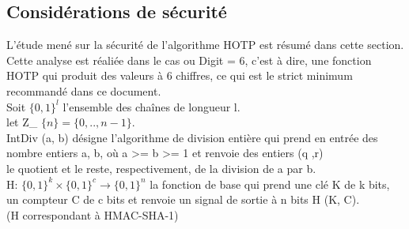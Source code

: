 \documentclass{../res/univ-projet}
\begin{document}
  \subsection{Considérations de sécurité}
L'\'{e}tude men\'{e} sur la s\'{e}curit\'{e} de l'algorithme HOTP est r\'{e}sum\'{e} dans cette section.
  Cette analyse est r\'{e}ali\'{e}e dans le cas ou Digit = 6, c'est \`{a} dire, une fonction HOTP qui produit des valeurs \`{a} 6 chiffres, ce qui est le strict minimum recommand\'{e} dans ce document.\\
  Soit $\{ 0,1 \} ^l$ l'ensemble des cha\^{i}nes de longueur l.\\
  let Z\_ $\{n\} = \{0, ..,n-1\}$.\\
  IntDiv (a, b) d\'{e}signe l'algorithme de division enti\`{e}re qui prend en entr\'{e}e des nombre entiers a, b, o\`{u} a >= b >= 1 et renvoie des entiers (q ,r)\\
  le quotient et le reste, respectivement, de la division de a par b.\\
  H: $\{0,1\}^k \times{} \{0,1\}^c \rightarrow \{0,1\}^n$ la fonction de base qui prend une cl\'{e} K de k bits, un compteur C de c bits et renvoie un signal de sortie \`{a} n bits H (K, C).\\
  (H correspondant \`{a} HMAC-SHA-1)
\end{document}
